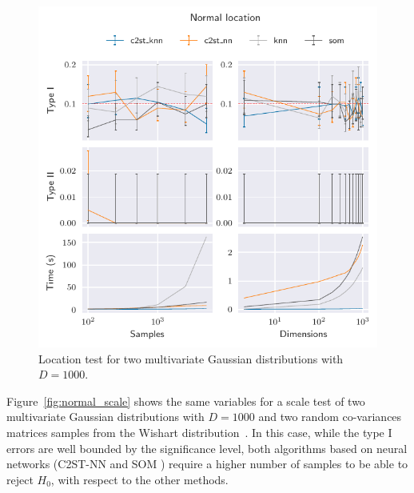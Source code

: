 \begin{figure}[htpb]
    \centering
    \includegraphics{images/6_som/normal_location}
    \caption[Location test for two multivariate Gaussian distributions.]{
    Location test for two multivariate Gaussian distributions with $D=1000$.
    }
    \label{fig:normal_location}
\end{figure}

Figure~\ref{fig:normal_scale} shows the same variables for a scale test of two multivariate
Gaussian distributions with $D=1000$ and two random co-variances matrices samples from the
Wishart distribution~\cite{smith1972algorithm}. In this case, while the type I errors are
well bounded by the significance level, both algorithms based on neural networks
(C2ST-NN and \gls{SOM} ) require a higher number of samples to be able to reject $H_0$, with respect
to the other methods.

